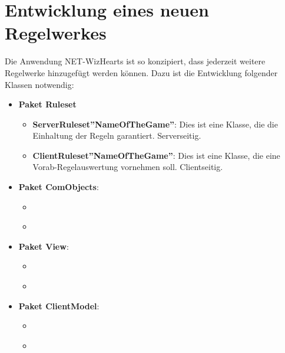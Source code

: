\documentclass[titlepage,10pt,a4paper]{article}
\begin{document}
\section{Entwicklung eines neuen \gls{Regelwerk}es}
Die Anwendung NET-WizHearts ist so konzipiert, dass jederzeit weitere \gls{Regelwerk}e hinzugefügt werden können.
Dazu ist die Entwicklung folgender Klassen notwendig:
\begin{itemize}
\item \textbf{Paket Ruleset}
	\begin{itemize}
	\item \textbf{ServerRuleset''NameOfTheGame''}: Dies ist eine Klasse, die die Einhaltung der Regeln garantiert. Serverseitig.
	\item \textbf{ClientRuleset''NameOfTheGame''}: Dies ist eine Klasse, die eine Vorab-Regelauswertung vornehmen soll. Clientseitig. 
	\end{itemize}
\item \textbf{Paket ComObjects}:
\begin{itemize}
	\item \textbf{}
	\item \textbf{}
	\end{itemize}
\item \textbf{Paket View}:
\begin{itemize}
	\item \textbf{}
	\item \textbf{}
	\end{itemize}
\item \textbf{Paket ClientModel}:
\begin{itemize}
	\item \textbf{}
	\item \textbf{}
	\end{itemize}
\end{itemize}

\newpage
\printglossaries
\end{document}
